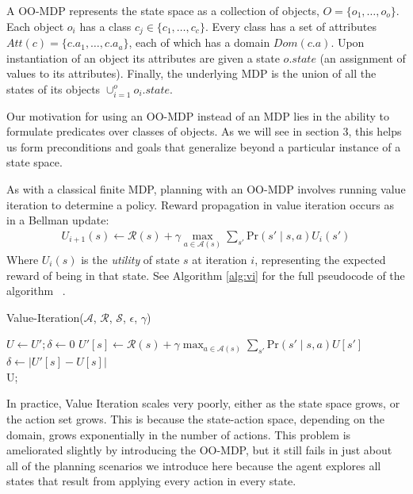 \documentclass[]{article}
\begin{document}
A OO-MDP represents the state space as a collection of objects,
$O = \{o_1, \ldots, o_o \}$.  Each object $o_i$ has a
class $c_j \in  \{c_1, \ldots, c_c\}$. Every class has a set of attributes
$Att(c) = \{c.a_1, \ldots, c.a_a \}$, each of which has a domain $Dom(c.a)$.
Upon instantiation of an object its attributes are given a state $o.state$
(an assignment of values to its attributes).  Finally, the underlying MDP is the union
of all the states of its objects $\cup_{i = 1}^o o_i.state$. ~\citep{diuk08}

Our motivation for using an OO-MDP instead of an MDP lies in the
ability to formulate predicates over classes of objects. As we will
see in section 3, this helps us form preconditions and goals that
generalize beyond a particular instance of a state space.

As with a classical finite MDP, planning with an OO-MDP involves
running value iteration to determine a policy.  Reward propagation in
value iteration occurs as in a Bellman update:
\begin{align}
U_{i+1}(s) \leftarrow \mathcal{R}(s) + \gamma \max_{a \in \mathcal{A}(s)} \sum_{s'} \text{Pr}(s' \mid s, a)U_i(s')
\end{align}
Where $U_i(s)$ is the {\it utility} of state $s$ at iteration $i$, 
representing the expected reward of being in that state. See Algorithm \ref{alg:vi} for the full pseudocode of the algorithm ~\citep{russellnorvigAI}.

\begin{algorithm}
  \caption{Value-Iteration($\mathcal{A}$, $\mathcal{R}$, $\mathcal{S}$, $\epsilon$, $\gamma$)}
  \begin{algorithmic}[1]
    \State $U \gets U';\delta \gets 0$
    \State $U'[s] \leftarrow \mathcal{R}(s) + \gamma \max_{a \in \mathcal{A}(s)} \sum_{s'} \text{Pr}(s'\mid s,a) U[s']$
    	\State $\delta \gets |U'[s] - U[s]|$ 
    \EndIf
    \EndFor
    \EndWhile \\
    \Return U;
  \end{algorithmic}
  \label{alg:vi}
\end{algorithm}


In practice, Value Iteration scales very poorly, either as the state
space grows, or the action set grows. This is because the state-action
space, depending on the domain, grows exponentially in the number of
actions.  This problem is ameliorated slightly by introducing the
OO-MDP, but it still fails in just about all of the planning scenarios
we introduce here because the agent explores all states that result
from applying every action in every state.  
\end{document}
